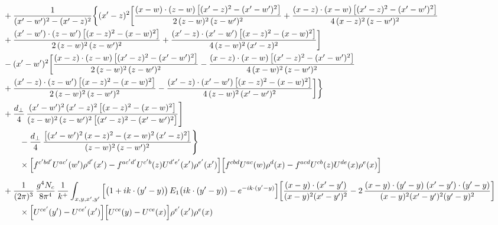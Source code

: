 \documentclass[10pt]{article}
\begin{document}
\begin{align}
&+\frac{1}{(x^{\prime}-w^{\prime})^{2}-(x^{\prime}-z)^{2}}\bigg\{(x^{\prime}-z)^{2}\bigg[\frac{(x-w)\cdot(z-w)\,\big[(x^{\prime}-z)^{2}-(x^{\prime}-w^{\prime})^{2}\big]}{2\,(z-w)^{2}\,(z-w^{\prime})^{2}}+\frac{(x-z)\cdot(x-w)\,\big[(x^{\prime}-z)^{2}-(x^{\prime}-w^{\prime})^{2}\big]}{4\,(x-z)^{2}\,(z-w^{\prime})^{2}}\notag \\ & +\frac{(x^{\prime}-w^{\prime})\cdot(z-w^{\prime})\,\big[(x-z)^{2}-(x-w)^{2}\big]}{2\,(z-w)^{2}\,(z-w^{\prime})^{2}}+\frac{(x^{\prime}-z)\cdot(x^{\prime}-w^{\prime})\,\big[(x-z)^{2}-(x-w)^{2}\big]}{4\,(z-w)^{2}\,(x^{\prime}-z)^{2}}\bigg]\notag\\
&-(x^{\prime}-w^{\prime})^{2}\bigg[\frac{(x-z)\cdot(z-w)\,\big[(x^{\prime}-z)^{2}-(x^{\prime}-w^{\prime})^{2}\big]}{2\,(z-w)^{2}\,(z-w^{\prime})^{2}}-\frac{(x-z)\cdot(x-w)\,\big[(x^{\prime}-z)^{2}-(x^{\prime}-w^{\prime})^{2}\big]}{4\,(x-w)^{2}\,(z-w^{\prime})^{2}}\notag \\ & +\frac{(x^{\prime}-z)\cdot(z-w^{\prime})\,\big[(x-z)^{2}-(x-w)^{2}\big]}{2\,(z-w)^{2}\,(z-w^{\prime})^{2}}-\frac{(x^{\prime}-z)\cdot(x^{\prime}-w^{\prime})\,\big[(x-z)^{2}-(x-w)^{2}\big]}{4\,(z-w)^{2}\,(x^{\prime}-w^{\prime})^{2}}\bigg]\bigg\}\notag\\
&+\frac{d_{\perp}}{4}\,\frac{(x^{\prime}-w^{\prime})^{2}\,(x^{\prime}-z)^{2}\,\big[(x-z)^{2}-(x-w)^{2}\big]}{(z-w)^{2}\,(z-w^{\prime})^{2}\,\big[(x^{\prime}-z)^{2}-(x^{\prime}-w^{\prime})^{2}\big]}\Bigg]\notag\\
&\qquad-\frac{d_{\perp}}{4}\,\frac{\big[(x^{\prime}-w^{\prime})^{2}\,(x-z)^{2}-(x-w)^{2}\,(x^{\prime}-z)^{2}\big]}{(z-w)^{2}\,(z-w^{\prime})^{2}}\Bigg\}\notag\\&\qquad\times\Big[f^{c^{\prime}bd^{\prime}}U^{ac^{\prime}}(w^{\prime})\rho^{d^{\prime}}(x^{\prime})-f^{ac^{\prime}d^{\prime}}U^{c^{\prime}b}(z)U^{d^{\prime}e^{\prime}}(x^{\prime})\rho^{e^{\prime}}(x^{\prime})\Big]\Big[f^{cbd}U^{ac}(w)\rho^{d}(x)-f^{acd}U^{cb}(z)U^{de}(x)\rho^{e}(x)\Big]\notag\\[6pt]
&+\frac{1}{(2\pi)^{3}}\,\frac{g^{4}N_{c}}{8\pi^{4}}\,\frac{1}{k^{+}}\int_{x,y,x^{\prime},y^{\prime}}\Big[\big(1+ik\cdot(y^{\prime}-y)\big)\,E_{1}\big(ik\cdot(y^{\prime}-y)\big)-e^{-ik\cdot(y^{\prime}-y)}\Big]\bigg[\frac{(x-y)\cdot(x^{\prime}-y^{\prime})}{(x-y)^{2}(x^{\prime}-y^{\prime})^{2}}-2\,\frac{(x-y)\cdot(y^{\prime}-y)\;(x^{\prime}-y^{\prime})\cdot(y^{\prime}-y)}{(x-y)^{2}(x^{\prime}-y^{\prime})^{2}(y^{\prime}-y)^{2}}\bigg]\notag\\&\qquad\times\Big[U^{ce^{\prime}}(y^{\prime})-U^{ce^{\prime}}(x^{\prime})\Big]\Big[U^{ce}(y)-U^{ce}(x)\Big]\rho^{e^{\prime}}(x^{\prime})\rho^{e}(x)
\end{align}
\end{document}

